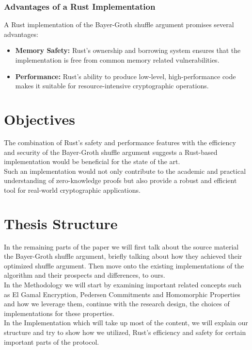 \documentclass[12pt,a4paper]{report}
\begin{document}
\subsubsection{Advantages of a Rust Implementation}
A Rust implementation of the Bayer-Groth shuffle argument promises several advantages:
\begin{itemize}
    \item \textbf{Memory Safety:} Rust's ownership and borrowing system ensures that the implementation is free from common memory related vulnerabilities.
     \item \textbf{Performance:} Rust’s ability to produce low-level, high-performance code makes it suitable for resource-intensive cryptographic operations.
\end{itemize}

\section{Objectives}
The combination of Rust's safety and performance features with the efficiency and security of the Bayer-Groth shuffle argument
suggests a Rust-based implementation would be beneficial for the state of the art.
\\Such an implementation would not only contribute to the academic and practical understanding of
zero-knowledge proofs but also provide a robust and efficient tool for real-world cryptographic applications.

\section{Thesis Structure}
In the remaining parts of the paper we will first talk about the source material the Bayer-Groth
shuffle argument, briefly talking about how they achieved their optimized shuffle argument.
Then move onto the existing implementations of the algorithm and their prospects and differences,
to ours. \\

In the Methodology we will start by examining important related concepts such as El Gamal Encryption,
Pedersen Commitments and Homomorphic Properties and how we leverage them, continue with 
the research design, the choices of implementations for these properties.\\

In the Implementation which will take up most of the content, we will explain our structure and 
try to show how we utilized, Rust's efficiency and safety for certain important parts of the protocol.\\
\end{document}
